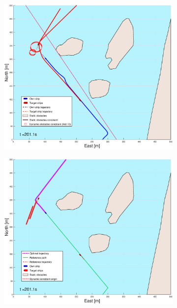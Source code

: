 \begin{figure}[ht]
\begin{subfigure}[b]{0.499\textwidth}
    \end{subfigure}
    \hfill
    \\
    \begin{subfigure}[b]{0.49\textwidth}
        \centering
        \includegraphics[width=\textwidth]{Images/Figures/Helloya/_Simple_1fig1_time=201}
    \end{subfigure}
    \hfill
    \begin{subfigure}[b]{0.499\textwidth}
        \centering
        \includegraphics[width=\textwidth]{Images/Figures/Helloya/_Simple_1fig999_time=201}

\end{subfigure}
\end{figure}
